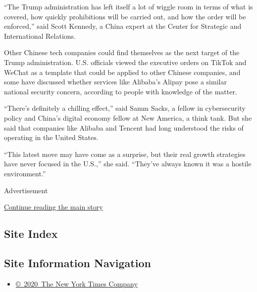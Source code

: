 ``The Trump administration has left itself a lot of wiggle room in terms
of what is covered, how quickly prohibitions will be carried out, and
how the order will be enforced,'' said Scott Kennedy, a China expert at
the Center for Strategic and International Relations.

Other Chinese tech companies could find themselves as the next target of
the Trump administration. U.S. officials viewed the executive orders on
TikTok and WeChat as a template that could be applied to other Chinese
companies, and some have discussed whether services like Alibaba's
Alipay pose a similar national security concern, according to people
with knowledge of the matter.

``There's definitely a chilling effect,'' said Samm Sacks, a fellow in
cybersecurity policy and China's digital economy fellow at New America,
a think tank. But she said that companies like Alibaba and Tencent had
long understood the risks of operating in the United States.

``This latest move may have come as a surprise, but their real growth
strategies have never focused in the U.S.,'' she said. ``They've always
known it was a hostile environment.''

Advertisement

\protect\hyperlink{after-bottom}{Continue reading the main story}

\hypertarget{site-index}{%
\subsection{Site Index}\label{site-index}}

\hypertarget{site-information-navigation}{%
\subsection{Site Information
Navigation}\label{site-information-navigation}}

\begin{itemize}
\tightlist
\item
  \href{https://help.nytimes3xbfgragh.onion/hc/en-us/articles/115014792127-Copyright-notice}{©~2020~The
  New York Times Company}
\end{itemize}

